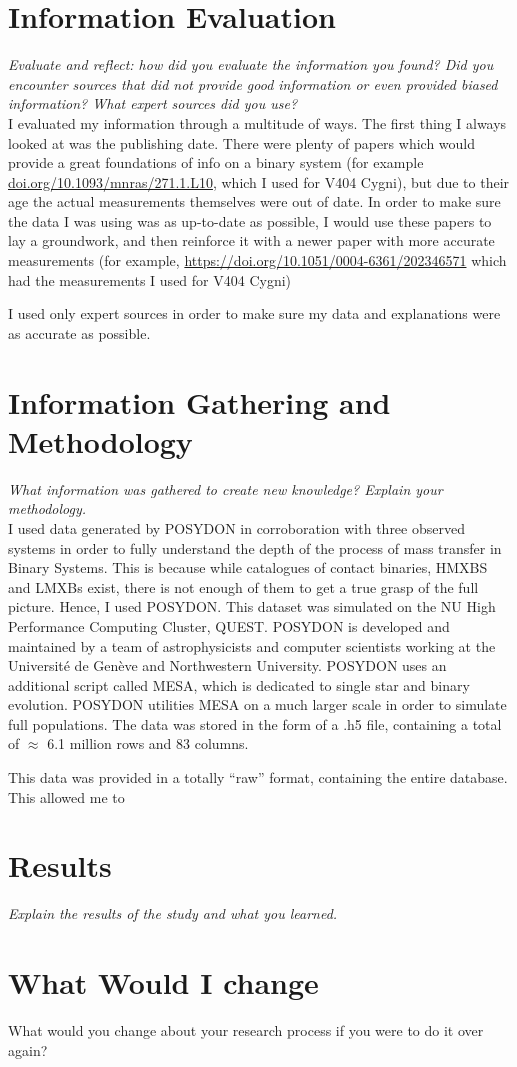 \documentclass[12pt, a4paper]{article}
\begin{document}
\section{Information Evaluation}
    \textit{Evaluate and reflect: how did you evaluate the information you found?  Did you encounter sources that did not provide good information or even provided biased information?  What expert sources did you use?}\\
    I evaluated my information through a multitude of ways. The first thing I always looked at was the publishing date. There were plenty of papers which would provide a great foundations of info on a binary system (for example \url{doi.org/10.1093/mnras/271.1.L10}, which I used for V404 Cygni), but due to their age the actual measurements themselves were out of date. In order to make sure the data I was using was as up-to-date as possible, I would use these papers to lay a groundwork, and then reinforce it with a newer paper with more accurate measurements (for example, \url{https://doi.org/10.1051/0004-6361/202346571} which had the measurements I used for V404 Cygni)

    I used only expert sources in order to make sure my data and explanations were as accurate as possible.

\section{Information Gathering and Methodology}
    \textit{What information was gathered to create new knowledge?  Explain your methodology.}\\
    I used data generated by POSYDON in corroboration with three observed systems in order to fully understand the depth of the process of mass transfer in Binary Systems. This is because while catalogues of contact binaries, HMXBS and LMXBs exist, there is not enough of them to get a true grasp of the full picture. Hence, I used POSYDON. This dataset was simulated on the NU High Performance Computing Cluster, QUEST. POSYDON is developed and maintained by a team of astrophysicists and computer scientists working at the Université de Genève and Northwestern University. POSYDON uses an additional script called MESA, which is dedicated to single star and binary evolution. POSYDON utilities MESA on a much larger scale in order to simulate full populations. The data was stored in the form of a .h5 file, containing a total of $\approx$ 6.1 million rows and 83 columns.

    This data was provided in a totally “raw” format, containing the entire database. This allowed me to 
\section{Results}
\textit{    Explain the results of the study and what you learned.
}\section{What Would I change}
    What would you change about your research process if you were to do it over again?
\end{document}
